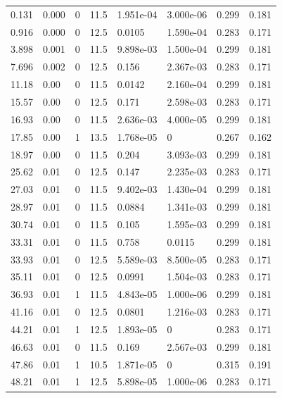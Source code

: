 \documentclass[preview]{standalone}
\begin{document}
{{\begin{tabular}{L{1.2cm}C{1.2cm} C{0.3cm}C{0.5cm} C{1.4cm}C{1.4cm} C{1.4cm}C{1.4cm}}
  0.131  &  0.000  & 0     & 11.5 &  1.951e-04  & 3.000e-06  & 0.299 &  0.181   \\ 
  0.916  &  0.000  & 0     & 12.5 &  0.0105  & 1.590e-04  & 0.283 &  0.171   \\ 
  3.898  &  0.001  & 0     & 11.5 &  9.898e-03  & 1.500e-04  & 0.299 &  0.181   \\ 
  7.696  &  0.002  & 0     & 12.5 &  0.156  & 2.367e-03  & 0.283 &  0.171   \\ 
  11.18  &  0.00  & 0     & 11.5 &  0.0142  & 2.160e-04  & 0.299 &  0.181   \\ 
  15.57  &  0.00  & 0     & 12.5 &  0.171  & 2.598e-03  & 0.283 &  0.171   \\ 
  16.93  &  0.00  & 0     & 11.5 &  2.636e-03  & 4.000e-05  & 0.299 &  0.181   \\ 
  17.85  &  0.00  & 1     & 13.5 &  1.768e-05  & 0  & 0.267 &  0.162   \\ 
  18.97  &  0.00  & 0     & 11.5 &  0.204  & 3.093e-03  & 0.299 &  0.181   \\ 
  25.62  &  0.01  & 0     & 12.5 &  0.147  & 2.235e-03  & 0.283 &  0.171   \\ 
  27.03  &  0.01  & 0     & 11.5 &  9.402e-03  & 1.430e-04  & 0.299 &  0.181   \\ 
  28.97  &  0.01  & 0     & 11.5 &  0.0884  & 1.341e-03  & 0.299 &  0.181   \\ 
  30.74  &  0.01  & 0     & 11.5 &  0.105  & 1.595e-03  & 0.299 &  0.181   \\ 
  33.31  &  0.01  & 0     & 11.5 &  0.758  & 0.0115  & 0.299 &  0.181   \\ 
  33.93  &  0.01  & 0     & 12.5 &  5.589e-03  & 8.500e-05  & 0.283 &  0.171   \\ 
  35.11  &  0.01  & 0     & 12.5 &  0.0991  & 1.504e-03  & 0.283 &  0.171   \\ 
  36.93  &  0.01  & 1     & 11.5 &  4.843e-05  & 1.000e-06  & 0.299 &  0.181   \\ 
  41.16  &  0.01  & 0     & 12.5 &  0.0801  & 1.216e-03  & 0.283 &  0.171   \\ 
  44.21  &  0.01  & 1     & 12.5 &  1.893e-05  & 0  & 0.283 &  0.171   \\ 
  46.63  &  0.01  & 0     & 11.5 &  0.169  & 2.567e-03  & 0.299 &  0.181   \\ 
  47.86  &  0.01  & 1     & 10.5 &  1.871e-05  & 0  & 0.315 &  0.191   \\ 
  48.21  &  0.01  & 1     & 12.5 &  5.898e-05  & 1.000e-06  & 0.283 &  0.171   \\ 

\end{tabular}}}
\end{document}
